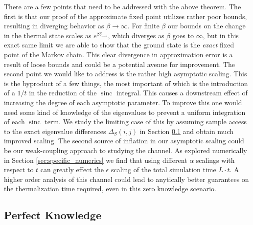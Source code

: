 \documentclass[
 amsmath,amssymb,
 aps,
onecolumn, 
nofootinbib]{revtex4-2}
\DeclareMathOperator{\sinc}{sinc}
\begin{document}
There are a few points that need to be addressed with the above theorem. The first is that our proof of the approximate fixed point utilizes rather poor bounds, resulting in diverging behavior as $\beta \to \infty$. For finite $\beta$ our bounds on the change in the thermal state scales as $e^{\beta \delta_{\min}}$, which diverges as $\beta$ goes to $\infty$, but in this exact same limit we are able to show that the ground state is the \emph{exact} fixed point of the Markov chain. This clear divergence in approximation error is a result of loose bounds and could be a potential avenue for improvement. The second point we would like to address is the rather high asymptotic scaling. This is the byproduct of a few things, the most important of which is the introduction of a $1/t$ in the reduction of the $\sinc$ integral. This causes a downstream effect of increasing the degree of each asymptotic parameter. To improve this one would need some kind of knowledge of the eigenvalues to prevent a uniform integration of each $\sinc$ term. We study the limiting case of this by assuming sample access to the exact eigenvalue differences $\Delta_S(i,j)$ in Section \ref{sec:perfect_knowledge} and obtain much improved scaling. The second source of inflation in our asymptotic scaling could be our weak-coupling approach to studying the channel. As explored numerically in Section \ref{sec:specific_numerics} we find that using different $\alpha$ scalings with respect to $t$ can greatly effect the $\epsilon$ scaling of the total simulation time $L \cdot t$. A higher order analysis of this channel could lead to anytically better guarantees on the thermalization time required, even in this zero knowledge scenario.

\subsection{Perfect Knowledge} \label{sec:perfect_knowledge}
\end{document}
